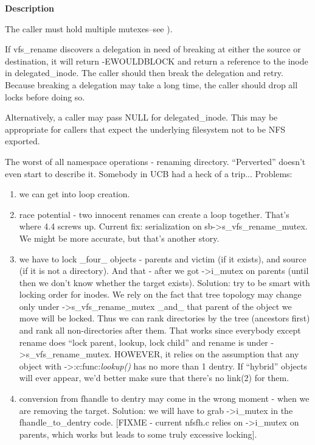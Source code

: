 \documentclass[a4paper,8pt,english]{sphinxmanual}
\begin{document}
\textbf{Description}

The caller must hold multiple mutexes--see ).

If vfs\_rename discovers a delegation in need of breaking at either
the source or destination, it will return -EWOULDBLOCK and return a
reference to the inode in delegated\_inode.  The caller should then
break the delegation and retry.  Because breaking a delegation may
take a long time, the caller should drop all locks before doing
so.

Alternatively, a caller may pass NULL for delegated\_inode.  This may
be appropriate for callers that expect the underlying filesystem not
to be NFS exported.

The worst of all namespace operations - renaming directory. ``Perverted''
doesn't even start to describe it. Somebody in UCB had a heck of a trip...
Problems:
\begin{enumerate}
\item {} 
we can get into loop creation.

\item {} 
race potential - two innocent renames can create a loop together.
That's where 4.4 screws up. Current fix: serialization on
sb-\textgreater{}s\_vfs\_rename\_mutex. We might be more accurate, but that's another
story.

\item {} 
we have to lock \_four\_ objects - parents and victim (if it exists),
and source (if it is not a directory).
And that - after we got -\textgreater{}i\_mutex on parents (until then we don't know
whether the target exists).  Solution: try to be smart with locking
order for inodes.  We rely on the fact that tree topology may change
only under -\textgreater{}s\_vfs\_rename\_mutex \_and\_ that parent of the object we
move will be locked.  Thus we can rank directories by the tree
(ancestors first) and rank all non-directories after them.
That works since everybody except rename does ``lock parent, lookup,
lock child'' and rename is under -\textgreater{}s\_vfs\_rename\_mutex.
HOWEVER, it relies on the assumption that any object with -\textgreater{}:c:func:\emph{lookup()}
has no more than 1 dentry.  If ``hybrid'' objects will ever appear,
we'd better make sure that there's no link(2) for them.

\item {} 
conversion from fhandle to dentry may come in the wrong moment - when
we are removing the target. Solution: we will have to grab -\textgreater{}i\_mutex
in the fhandle\_to\_dentry code. {[}FIXME - current nfsfh.c relies on
-\textgreater{}i\_mutex on parents, which works but leads to some truly excessive
locking{]}.

\end{enumerate}
\end{document}
